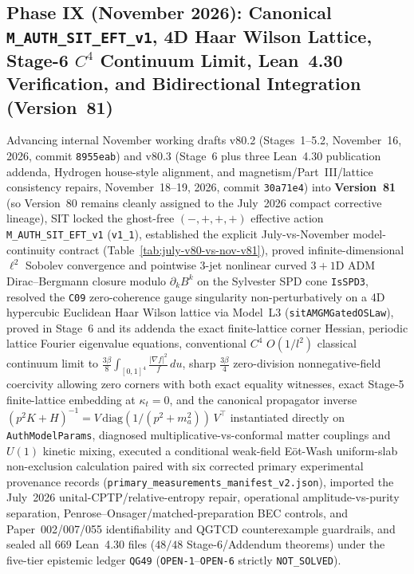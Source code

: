 \subsection{Phase IX (November 2026): Canonical \texttt{M\_AUTH\_SIT\_EFT\_v1}, 4D Haar Wilson Lattice, Stage-6 $C^4$ Continuum Limit, Lean~4.30 Verification, and Bidirectional Integration (Version~81)}
Advancing internal November working drafts v80.2 (Stages~1--5.2, November~16, 2026, commit \texttt{8955eab}) and v80.3 (Stage~6 plus three Lean~4.30 publication addenda, Hydrogen house-style alignment, and magnetism/Part~III/lattice consistency repairs, November~18--19, 2026, commit \texttt{30a71e4}) into \textbf{Version~81} (so Version~80 remains cleanly assigned to the July~2026 compact corrective lineage), SIT locked the ghost-free $(-,+,+,+)$ effective action \texttt{M\_AUTH\_SIT\_EFT\_v1} (\texttt{v1\_1}), established the explicit July-vs-November model-continuity contract (Table~\ref{tab:july-v80-vs-nov-v81}), proved infinite-dimensional $\ell^2$ Sobolev convergence and pointwise 3-jet nonlinear curved $3+1$D ADM Dirac--Bergmann closure modulo $\partial_k B^k$ on the Sylvester SPD cone \texttt{IsSPD3}, resolved the \texttt{C09} zero-coherence gauge singularity non-perturbatively on a 4D hypercubic Euclidean Haar Wilson lattice via Model~L3 (\texttt{sitAMGMGatedOSLaw}), proved in Stage~6 and its addenda the exact finite-lattice corner Hessian, periodic lattice Fourier eigenvalue equations, conventional $C^4$ $O(1/l^2)$ classical continuum limit to $\frac{3\beta}{8}\int_{[0,1]^4}\frac{|\nabla f|^2}{f}\,du$, sharp $\frac{3\beta}{4}$ zero-division nonnegative-field coercivity allowing zero corners with both exact equality witnesses, exact Stage-5 finite-lattice embedding at $\kappa_t = 0$, and the canonical propagator inverse $(p^2 K + H)^{-1} = V\,\mathrm{diag}(1/(p^2+m_a^2))\,V^\top$ instantiated directly on \texttt{AuthModelParams}, diagnosed multiplicative-vs-conformal matter couplings and $U(1)$ kinetic mixing, executed a conditional weak-field E\"ot-Wash uniform-slab non-exclusion calculation paired with six corrected primary experimental provenance records (\texttt{primary\_measurements\_manifest\_v2.json}), imported the July~2026 unital-CPTP/relative-entropy repair, operational amplitude-vs-purity separation, Penrose--Onsager/matched-preparation BEC controls, and Paper~002/007/055 identifiability and QGTCD counterexample guardrails, and sealed all $669$ Lean~4.30 files ($48/48$ Stage-6/Addendum theorems) under the five-tier epistemic ledger \texttt{QG49} (\texttt{OPEN-1}--\texttt{OPEN-6} strictly \texttt{NOT\_SOLVED}).

